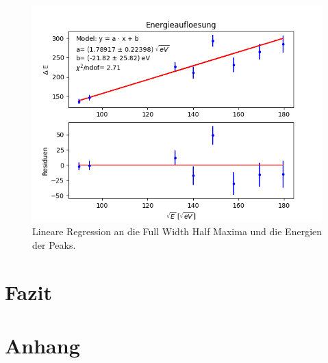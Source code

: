 \documentclass[12pt,a4paper]{article}
\begin{document}
\begin{figure}
\centering
\includegraphics[scale=0.8]{Bilder/Energieaufloesung/roentgen_gesamt.png}
\caption{Lineare Regression an die Full Width Half Maxima und die Energien der Peaks.}
\label{fig:roentgen_energieaufloesung}
\end{figure}

\section{Fazit}
\newpage 
\section{Anhang}
\end{document}
